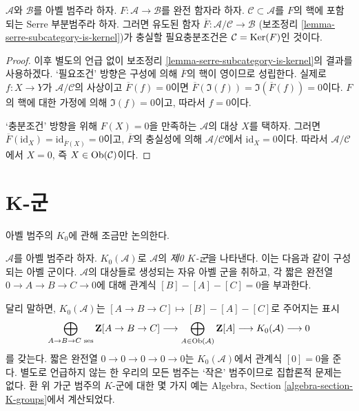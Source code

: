 \begin{lemma}
\label{lemma-quotient-by-kernel-exact-functor}
$\mathcal{A}$와 $\mathcal{B}$를 아벨 범주라 하자.
$F : \mathcal{A} \to \mathcal{B}$를 완전 함자라 하자.
$\mathcal{C} \subset \mathcal{A}$를 $F$의 핵에 포함되는 Serre
부분범주라 하자. 그러면 유도된 함자
$\overline{F} : \mathcal{A}/\mathcal{C} \to \mathcal{B}$
(보조정리 \ref{lemma-serre-subcategory-is-kernel})가 충실할
필요충분조건은 $\mathcal{C} = \mathop{\mathrm{Ker}}(F)$인 것이다.
\end{lemma}

\begin{proof}
이후 별도의 언급 없이 보조정리
\ref{lemma-serre-subcategory-is-kernel}의 결과를 사용하겠다.
‘필요조건’ 방향은 구성에 의해 $\overline{F}$의 핵이 영이므로
성립한다. 실제로 $f : X \to Y$가 $\mathcal{A}/\mathcal{C}$의
사상이고 $\overline{F}(f) = 0$이면
$\overline{F}(\Im(f)) = \Im(\overline{F}(f)) = 0$이다.
$F$의 핵에 대한 가정에 의해 $\Im(f) = 0$이고, 따라서 $f = 0$이다.

\medskip\noindent
‘충분조건’ 방향을 위해 $F(X) = 0$을 만족하는 $\mathcal{A}$의 대상
$X$를 택하자. 그러면
$\overline{F}(\text{id}_X) = \text{id}_{\overline{F}(X)} = 0$이고,
$\overline{F}$의 충실성에 의해 $\mathcal{A}/\mathcal{C}$에서
$\text{id}_X = 0$이다. 따라서 $\mathcal{A}/\mathcal{C}$에서
$X = 0$, 즉 $X \in \mathop{\mathrm{Ob}}\nolimits(\mathcal{C})$이다.
\end{proof}






\section{K-군}
\label{section-K-groups}

\noindent
아벨 범주의 $K_0$에 관해 조금만 논의한다.

\begin{definition}
\label{definition-K-zero}
$\mathcal{A}$를 아벨 범주라 하자.
$K_0(\mathcal{A})$로 $\mathcal{A}$의 {\it 제0 $K$-군}을 나타낸다.
이는 다음과 같이 구성되는 아벨 군이다.
$\mathcal{A}$의 대상들로 생성되는 자유 아벨 군을 취하고,
각 짧은 완전열 $0 \to A \to B \to C \to 0$에 대해 관계식
$[B] - [A] - [C] = 0$을 부과한다.
\end{definition}

\noindent
달리 말하면, $K_0(\mathcal{A})$는
$[A \to B \to C] \mapsto [B] - [A] - [C]$로 주어지는 표시
$$
\bigoplus_{A \to B \to C\text{ ses}}
\mathbf{Z}[A \to B \to C]
\longrightarrow
\bigoplus_{A \in \mathop{\mathrm{Ob}}\nolimits(\mathcal{A})}
\mathbf{Z}[A]
\longrightarrow
K_0(\mathcal{A})
\longrightarrow
0
$$
를 갖는다. 짧은 완전열 $0 \to 0 \to 0 \to 0 \to 0$는
$K_0(\mathcal{A})$에서 관계식 $[0] = 0$을 준다.
별도로 언급하지 않는 한 우리의 모든 범주는 ‘작은’ 범주이므로
집합론적 문제는 없다.
환 위 가군 범주의 $K$-군에 대한 몇 가지 예는
Algebra, Section \ref{algebra-section-K-groups}에서 계산되었다.

